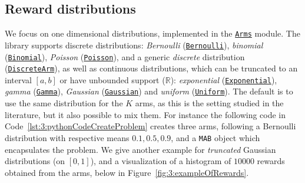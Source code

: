 \subsection{Reward distributions}
%
We focus on one dimensional distributions, implemented in the \texttt{\href{https://smpybandits.github.io/docs/Arms.html}{Arms}} module.
The library supports discrete distributions: \emph{Bernoulli} (\texttt{\href{https://smpybandits.github.io/docs/Arms.Bernoulli.html}{Bernoulli}}), \emph{binomial} (\texttt{\href{https://smpybandits.github.io/docs/Arms.Binomial.html}{Binomial}}), \emph{Poisson} (\texttt{\href{https://smpybandits.github.io/docs/Arms.Poisson.html}{Poisson}}), and a generic \emph{discrete} distribution (\texttt{\href{https://smpybandits.github.io/docs/Arms.DiscreteArm.html}{DiscreteArm}}),
as well as continuous distributions,
which can be truncated to an interval $[a,b]$ or have unbounded support ($\mathbb{R}$):
\emph{exponential} (\texttt{\href{https://smpybandits.github.io/docs/Arms.Exponential.html}{Exponential}}), \emph{gamma} (\texttt{\href{https://smpybandits.github.io/docs/Arms.Gamma.html}{Gamma}}), \emph{Gaussian} (\texttt{\href{https://smpybandits.github.io/docs/Arms.Gaussian.html}{Gaussian}}) and \emph{uniform} (\texttt{\href{https://smpybandits.github.io/docs/Arms.Uniform.html}{Uniform}}).
%
The default is to use the same distribution for the $K$ arms, as this is the setting studied in the literature,
but it also possible to mix them.
%
For instance the following code in Code~\ref{lst:3:pythonCodeCreateProblem} creates three arms, following a Bernoulli distribution with respective means $0.1, 0.5, 0.9$, and a \texttt{MAB} object which encapsulates the problem.
We give another example for \emph{truncated} Gaussian distributions (on $[0,1]$), and a visualization of a histogram of $10000$ rewards obtained from the arms, below in Figure~\ref{fig:3:exampleOfRewards}.

